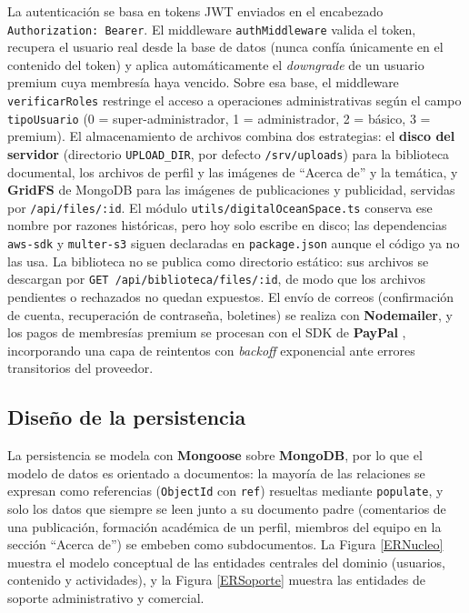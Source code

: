 La autenticación se basa en tokens JWT \cite{jwt2015} enviados en el encabezado \texttt{Authorization: Bearer}. El middleware \texttt{authMiddleware} valida el token, recupera el usuario real desde la base de datos (nunca confía únicamente en el contenido del token) y aplica automáticamente el \textit{downgrade} de un usuario premium cuya membresía haya vencido. Sobre esa base, el middleware \texttt{verificarRoles} restringe el acceso a operaciones administrativas según el campo \texttt{tipoUsuario} (0 = super-administrador, 1 = administrador, 2 = básico, 3 = premium). El almacenamiento de archivos combina dos estrategias: el \textbf{disco del servidor} (directorio \texttt{UPLOAD\_DIR}, por defecto \texttt{/srv/uploads}) para la biblioteca documental, los archivos de perfil y las imágenes de ``Acerca de'' y la temática, y \textbf{GridFS} de MongoDB para las imágenes de publicaciones y publicidad, servidas por \texttt{/api/files/:id}. El módulo \texttt{utils/digitalOceanSpace.ts} conserva ese nombre por razones históricas, pero hoy solo escribe en disco; las dependencias \texttt{aws-sdk} y \texttt{multer-s3} siguen declaradas en \texttt{package.json} aunque el código ya no las usa. La biblioteca no se publica como directorio estático: sus archivos se descargan por \texttt{GET /api/biblioteca/files/:id}, de modo que los archivos pendientes o rechazados no quedan expuestos. El envío de correos (confirmación de cuenta, recuperación de contraseña, boletines) se realiza con \textbf{Nodemailer}, y los pagos de membresías premium se procesan con el SDK de \textbf{PayPal} \cite{paypaldev2024}, incorporando una capa de reintentos con \textit{backoff} exponencial ante errores transitorios del proveedor.

\subsection{Diseño de la persistencia}
La persistencia se modela con \textbf{Mongoose} sobre \textbf{MongoDB}, por lo que el modelo de datos es orientado a documentos: la mayoría de las relaciones se expresan como referencias (\texttt{ObjectId} con \texttt{ref}) resueltas mediante \texttt{populate}, y solo los datos que siempre se leen junto a su documento padre (comentarios de una publicación, formación académica de un perfil, miembros del equipo en la sección ``Acerca de'') se embeben como subdocumentos. La Figura \ref{ERNucleo} muestra el modelo conceptual de las entidades centrales del dominio (usuarios, contenido y actividades), y la Figura \ref{ERSoporte} muestra las entidades de soporte administrativo y comercial.

